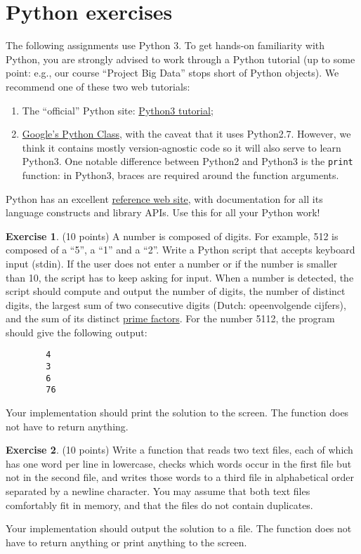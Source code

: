 \documentclass[a4paper]{report}
\theoremstyle{definition}
\newtheorem{exercise}{Exercise}
\begin{document}
	\section*{Python exercises}
	\label{python-exercises}
	The following assignments use Python 3. To get hands-on familiarity with
	Python, you are strongly advised to work through a Python tutorial (up to
	some point: e.g., our course ``Project Big Data'' stops short of Python objects). We recommend one of these two web tutorials:
	\begin{enumerate}
		\setlength\itemsep{1mm}
		\item The ``official'' Python site: \href{https://docs.python.org/3/tutorial}{Python3 tutorial};
		\item \href{https://developers.google.com/edu/python/}{Google's Python Class}, with the caveat that it uses Python2.7. However, we think it contains	mostly version-agnostic code so it will also serve to learn Python3.
		One notable difference between Python2 and Python3 is the
		{\small\texttt{print}} function: in Python3, braces are required around
		the function arguments.
	\end{enumerate}
	
	\noindent Python has an excellent \href{https://docs.python.org/3/}{reference web site}, with documentation for all its language
	constructs and library APIs. Use this for all your Python work!
	
	\begin{exercise}
		(10 points) A number is composed of digits. For example, 512 is composed of a “5”, a “1” and  a “2”. Write a Python script that accepts keyboard input (stdin). If the user does not enter a number or if the number is smaller than 10, the script has to keep asking for input. When a number is detected, the script should compute and output the number of digits, the number of distinct digits, the largest sum of two consecutive digits  (Dutch: opeenvolgende cijfers), and the sum of its distinct \href{https://en.wikipedia.org/wiki/Prime_factor}{prime factors}. For the number 5112, the program should give the following output:
		
		\begin{verbatim}
		4
		3
		6
		76
		\end{verbatim}
		
		\noindent Your implementation should print the solution to the screen. The function does not have to return anything.
	\end{exercise}
	
	\begin{exercise}
		(10 points) Write a function that reads two text files, each of which has one word per line in lowercase, checks which words occur in
		the first file but not in the second file, and writes those words to a third file in alphabetical order separated by a newline character. You	may assume that both text files comfortably fit in memory, and that the	files do not contain duplicates.
		
		Your implementation should output the solution to a file. The function does not have to return anything or print anything to the screen.	
	\end{exercise}
	
\end{document}
